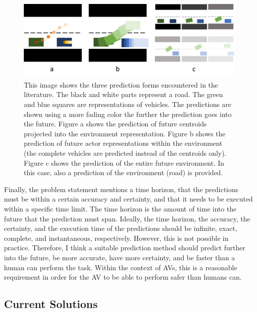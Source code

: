 \begin{figure}[h!]
	\centering
	\includegraphics[width=0.8\linewidth]{Figures/Introduction/Prediction_forms}
	\caption{This image shows the three prediction forms encountered in the literature. The black and white parts represent a road. The green and blue squares are representations of vehicles. The predictions are shown using a more fading color the further the prediction goes into the future. Figure a shows the prediction of future centroids projected into the environment representation. Figure b shows the prediction of future actor representations within the environment (the complete vehicles are predicted instead of the centroids only). Figure c shows the prediction of the entire future environment. In this case, also a prediction of the environment (road) is provided.}  
	\label{fig:pred_froms}
\end{figure}

Finally, the problem statement mentions a time horizon, that the predictions must be within a certain accuracy and certainty, and that it needs to be executed within a specific time limit. The time horizon is the amount of time into the future that the prediction must span. Ideally, the time horizon, the accuracy, the certainty, and the execution time of the predictions should be infinite, exact, complete, and instantaneous, respectively. However, this is not possible in practice. Therefore, I think a suitable prediction method should predict further into the future, be more accurate, have more certainty, and be faster than a human can perform the task. Within the context of \glspl{AV}, this is a reasonable requirement in order for the \gls{AV} to be able to perform safer than humans can.   


\subsection{Current Solutions}

